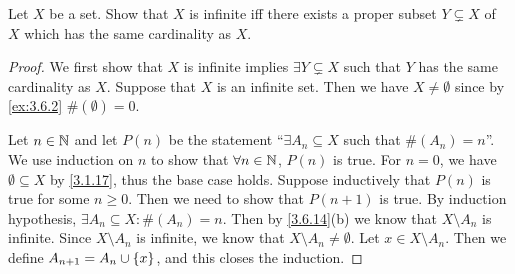 \exercisesection

\begin{ex}\label{ex:8.1.1}
  Let \(X\) be a set.
  Show that \(X\) is infinite iff there exists a proper subset \(Y \subsetneq X\) of \(X\) which has the same cardinality as \(X\).
\end{ex}

\begin{proof}
  We first show that \(X\) is infinite implies \(\exists Y \subsetneq X\) such that \(Y\) has the same cardinality as \(X\).
  Suppose that \(X\) is an infinite set.
  Then we have \(X \neq \emptyset\) since by \cref{ex:3.6.2} \(\#(\emptyset) = 0\).

  Let \(n \in \mathbb{N}\) and let \(P(n)\) be the statement ``\(\exists A_n \subseteq X\) such that \(\#(A_n) = n\)''.
  We use induction on \(n\) to show that \(\forall n \in \mathbb{N}\), \(P(n)\) is true.
  For \(n = 0\), we have \(\emptyset \subseteq X\) by \cref{3.1.17}, thus the base case holds.
  Suppose inductively that \(P(n)\) is true for some \(n \geq 0\).
  Then we need to show that \(P(n + 1)\) is true.
  By induction hypothesis, \(\exists A_n \subseteq X : \#(A_n) = n\).
  Then by \cref{3.6.14}(b) we know that \(X \setminus A_n\) is infinite.
  Since \(X \setminus A_n\) is infinite, we know that \(X \setminus A_n \neq \emptyset\).
  Let \(x \in X \setminus A_n\).
  Then we define \(A_{n + 1} = A_n \cup \left\lbrace x\right\rbrace\), and this closes the induction.


\end{proof}
